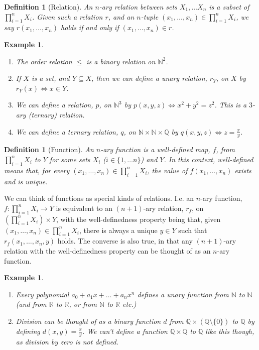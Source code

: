 \documentclass{article}
\theoremstyle{plain}
\newtheorem{definition}[theorem]{Definition}{\bfseries}{\upshape}
\newtheorem{example}[theorem]{Example}{\bfseries}{\upshape}
\newcommand{\bN}{\mathbb{N}}
\newcommand{\bQ}{\mathbb{Q}}
\newcommand{\bR}{\mathbb{R}}
\begin{document}
\begin{definition}[Relation]
An $n$-ary relation between sets $X_1,\ldots X_n$ is a subset of $\prod_{i=1}^n X_i$. Given such a relation $r$, and an $n$-tuple $(x_1,\ldots,x_n)\in \prod_{i=1}^n X_i$, we say $r(x_1,\ldots,x_n)$ holds if and only if $(x_1,\ldots,x_n)\in r$. 
\end{definition}

\begin{example}\mbox{}
\begin{enumerate}
\item The order relation $\leq$ is a binary relation on $\bN^2$.
\item If $X$ is a set, and $Y\subseteq X$, then we can define a unary relation, $r_Y$, on $X$ by $r_Y(x)\iff x\in Y$.
\item We can define a relation, $p$, on $\bN^3$ by $p(x,y,z)\iff x^2+ y^2 = z^2$. This is a $3$-ary (ternary) relation.
\item We can define a ternary relation, $q$, on $\bN\times \bN \times \bQ$ by $q(x,y,z)\iff z=\frac{x}{y}$.
\end{enumerate}
\end{example}

\begin{definition}[Function]
An $n$-ary function is a well-defined map, $f$, from $\prod_{i=1}^n X_i$ to $Y$ for some sets $X_i$ ($i\in\{1,\ldots n\}$) and $Y$. In this context, well-defined means that, for every $(x_1,\ldots,x_n)\in \prod_{i=1}^n X_i$, the value of $f(x_1,\ldots,x_n)$ exists and is unique. 
\end{definition}

We can think of functions as special kinds of relations. I.e. an $n$-ary function, $f:\prod_{i=1}^n X_i\to Y$ is equivalent to an $(n+1)$-ary relation, $r_f$, on $(\prod_{i=1}^n X_i)\times Y$, with the well-definedness property being that, given $(x_1,\ldots,x_n)\in \prod_{i=1}^n X_i$, there is always a unique $y\in Y$ such that $r_f(x_1,\ldots,x_n,y)$ holds. The converse is also true, in that any $(n+1)$-ary relation with the well-definedness property can be thought of as an $n$-ary function.

\begin{example}\mbox{}
\begin{enumerate}
\item Every polynomial $a_0 + a_1 x+\ldots + a_n x^n$ defines a unary function from $\bN$ to $\bN$ (and from $\bR$ to $\bR$, or from $\bN$ to $\bR$ etc.)
\item Division can be thought of as a binary function $d$ from $\bQ\times (\bQ\setminus\{0\})$ to $\bQ$ by defining $d(x,y)=\frac{x}{y}$. We can't define a function $\bQ\times \bQ$ to $\bQ$ like this though, as division by zero is not defined.
\end{enumerate}
\end{example} 
\end{document}
